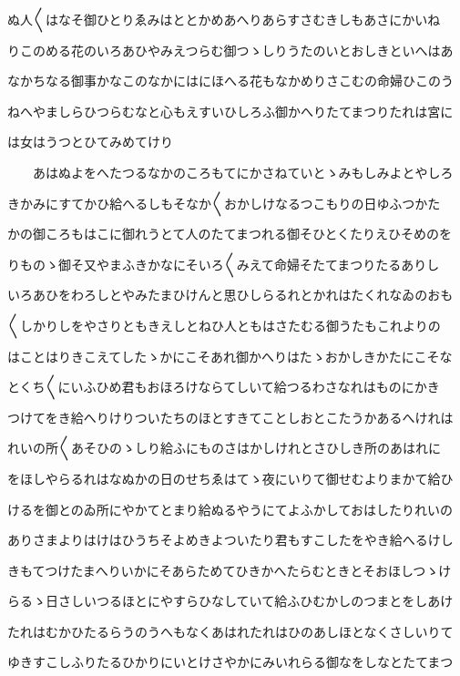 \documentclass[a4paper,11pt,landscape]{ltjtarticle}
\begin{document}
ぬ人〱はなそ御ひとりゑみはととかめあへりあらすさむきしもあさにかいね
\par\medskip
りこのめる花のいろあひやみえつらむ御つゝしりうたのいとおしきといへはあ
\par\medskip
なかちなる御事かなこのなかにはにほへる花もなかめりさこむの命婦ひこのう
\par\medskip
ねへやましらひつらむなと心もえすいひしろふ御かへりたてまつりたれは宮に
\par\medskip
は女はうつとひてみめてけり
\par\medskip
　　あはぬよをへたつるなかのころもてにかさねていとゝみもしみよとやしろ
\par\medskip
きかみにすてかひ給へるしもそなか〱おかしけなるつこもりの日ゆふつかた
\par\medskip
かの御ころもはこに御れうとて人のたてまつれる御そひとくたりえひそめのを
\par\medskip
りものゝ御そ又やまふきかなにそいろ〱みえて命婦そたてまつりたるありし
\par\medskip
いろあひをわろしとやみたまひけんと思ひしらるれとかれはたくれなゐのおも
\par\medskip
〱しかりしをやさりともきえしとねひ人ともはさたむる御うたもこれよりの
\par\medskip
はことはりきこえてしたゝかにこそあれ御かへりはたゝおかしきかたにこそな
\par\medskip
とくち〱にいふひめ君もおほろけならてしいて給つるわさなれはものにかき
\par\medskip
つけてをき給へりけりついたちのほとすきてことしおとこたうかあるへけれは
\par\medskip
れいの所〱あそひのゝしり給ふにものさはかしけれとさひしき所のあはれに
\par\medskip
をほしやらるれはなぬかの日のせちゑはてゝ夜にいりて御せむよりまかて給ひ
\par\medskip
けるを御とのゐ所にやかてとまり給ぬるやうにてよふかしておはしたりれいの
\par\medskip
ありさまよりはけはひうちそよめきよついたり君もすこしたをやき給へるけし
\par\medskip
きもてつけたまへりいかにそあらためてひきかへたらむときとそおほしつゝけ
\par\medskip
らるゝ日さしいつるほとにやすらひなしていて給ふひむかしのつまとをしあけ
\par\medskip
たれはむかひたるらうのうへもなくあはれたれはひのあしほとなくさしいりて
\par\medskip
ゆきすこしふりたるひかりにいとけさやかにみいれらる御なをしなとたてまつ
\end{document}
